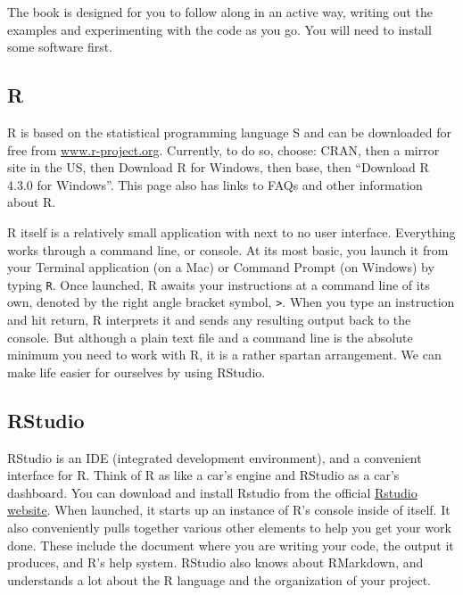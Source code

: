 \documentclass[
]{book}
\begin{document}
The book is designed for you to follow along in an active way, writing out the examples and experimenting with the code as you go. You will need to install some software first.

\hypertarget{r}{%
\subsection*{R}\label{r}}

R is based on the statistical programming language S and can be downloaded for free from \href{https://www.r-project.org/}{www.r-project.org}. Currently, to do so, choose: CRAN, then a mirror site in the US, then Download R for Windows, then base, then ``Download R 4.3.0 for Windows''. This page also has links to FAQs and other information about R.

R itself is a relatively small application with next to no user interface. Everything works through a command line, or console. At its most basic, you launch it from your Terminal application (on a Mac) or Command Prompt (on Windows) by typing \texttt{R}. Once launched, R awaits your instructions at a command line of its own, denoted by the right angle bracket symbol, \texttt{\textgreater{}}. When you type an instruction and hit return, R interprets it and sends any resulting output back to the console. But although a plain text file and a command line is the absolute minimum you need to work with R, it is a rather spartan arrangement. We can make life easier for ourselves by using RStudio.

\hypertarget{rstudio}{%
\subsection*{RStudio}\label{rstudio}}

RStudio is an IDE (integrated development environment), and a convenient interface for R. Think of R as like a car's engine and RStudio as a car's dashboard. You can download and install Rstudio from the official \href{https://rstudio.com/products/rstudio/download/}{Rstudio website}. When launched, it starts up an instance of R's console inside of itself. It also conveniently pulls together various other elements to help you get your work done. These include the document where you are writing your code, the output it produces, and R's help system. RStudio also knows about RMarkdown, and understands a lot about the R language and the organization of your project.
\end{document}
